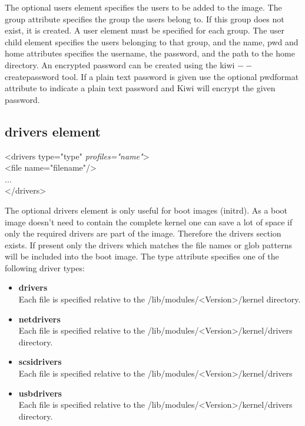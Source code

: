 The optional users element specifies the users to be added to the image.
The group attribute specifies the group the users belong to. If this group
does not exist, it is created. A user element must be specified for
each group. The user child element specifies the users belonging to that
group, and the name, pwd and home attributes specifies the username,
the password, and the path to the home directory. An encrypted password can be
created using the kiwi $--$createpassword tool. If a plain text password is
given use the optional pwdformat attribute to indicate a plain text password
and Kiwi will encrypt the given password.

\subsection{drivers element}
\begin{Command}{12cm}
<drivers type="type" \textit{profiles="name"}>\\
\hspace*{1cm}<file name="filename"/>\\
\hspace*{1cm}...\\
</drivers>
\end{Command}

The optional drivers element is only useful for boot images (initrd).
As a boot image doesn't need to contain the complete kernel one can
save a lot of space if only the required drivers are part of the image.
Therefore the drivers section exists. If present only the drivers which
matches the file names or glob patterns will be included into the
boot image. The type attribute specifies one of the following driver
types:

\begin{itemize}
\item \textbf{drivers}\\
      Each file is specified relative to the
      /lib/modules/<Version>/kernel directory.
\item \textbf{netdrivers}\\
      Each file is specified relative to the
      /lib/modules/<Version>/kernel/drivers
      directory.
\item \textbf{scsidrivers}\\
      Each file is specified relative to the
      /lib/modules/<Version>/kernel/drivers
\item \textbf{usbdrivers}\\
      Each file is specified relative to the
      /lib/modules/<Version>/kernel/drivers directory.
\end{itemize}

